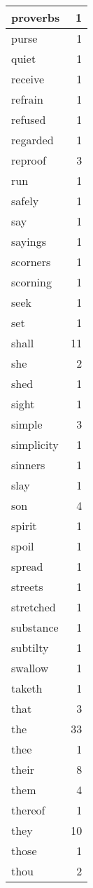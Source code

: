 \begin{center}
\begin{longtable}{l|r}
proverbs & 1\\ \hline 
purse & 1\\ \hline 
quiet & 1\\ \hline 
receive & 1\\ \hline 
refrain & 1\\ \hline 
refused & 1\\ \hline 
regarded & 1\\ \hline 
reproof & 3\\ \hline 
run & 1\\ \hline 
safely & 1\\ \hline 
say & 1\\ \hline 
sayings & 1\\ \hline 
scorners & 1\\ \hline 
scorning & 1\\ \hline 
seek & 1\\ \hline 
set & 1\\ \hline 
shall & 11\\ \hline 
she & 2\\ \hline 
shed & 1\\ \hline 
sight & 1\\ \hline 
simple & 3\\ \hline 
simplicity & 1\\ \hline 
sinners & 1\\ \hline 
slay & 1\\ \hline 
son & 4\\ \hline 
spirit & 1\\ \hline 
spoil & 1\\ \hline 
spread & 1\\ \hline 
streets & 1\\ \hline 
stretched & 1\\ \hline 
substance & 1\\ \hline 
subtilty & 1\\ \hline 
swallow & 1\\ \hline 
taketh & 1\\ \hline 
that & 3\\ \hline 
the & 33\\ \hline 
thee & 1\\ \hline 
their & 8\\ \hline 
them & 4\\ \hline 
thereof & 1\\ \hline 
they & 10\\ \hline 
those & 1\\ \hline 
thou & 2\\ \hline 

\end{longtable}
\end{center}
